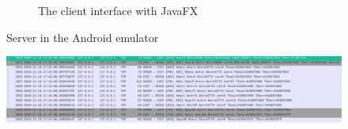 \begin{figure}[H]
\begin{subfigure}{.49\textwidth}
	\caption{The client interface with JavaFX}
	\label{fig:androidTCP}
\end{subfigure}%
	\caption{Server in the Android emulator}
	\label{fig:emulator}
\end{figure}


\begin{figure}[H]
	\includegraphics[width=1\linewidth]{images/task3/wiresharkAndroidEmuServer.png}
\end{figure}